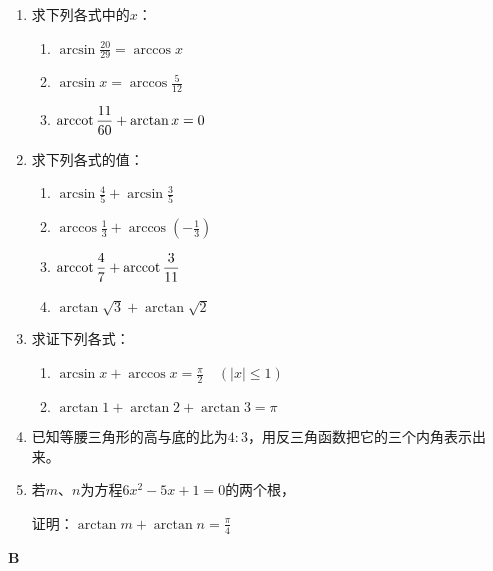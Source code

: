 \begin{enumerate}
\item 求下列各式中的$x$：
\begin{multicols}{2}
\begin{enumerate}[(1)]
    \item $\arcsin\frac{20}{29}=\arccos x$
    \item $\arcsin x=\arccos\frac{5}{12}$
    \item ${\rm arccot\,}\dfrac{11}{60}+\arctan x=0$
\end{enumerate}
\end{multicols}

\item 求下列各式的值：
\begin{multicols}{2}
\begin{enumerate}[(1)]
\item $\arcsin\frac{4}{5}+\arcsin\frac{3}{5}$
\item $\arccos\frac{1}{3}+\arccos\left(-\frac{1}{3}\right)$
\item ${\rm arccot\,}\dfrac{4}{7}+{\rm arccot\,} \dfrac{3}{11}$
\item $\arctan\sqrt{3}+\arctan\sqrt{2}$
\end{enumerate}
\end{multicols}

\item 求证下列各式：
\begin{enumerate}[(1)]
    \item $\arcsin x+\arccos x=\frac{\pi}{2}\quad (|x|\le 1)$
    \item $\arctan 1+\arctan 2+\arctan 3=\pi$
\end{enumerate}

\item 已知等腰三角形的高与底的比为$4:3$，用反三角函数把它的三个内角表示出来。
\item 若$m$、$n$为方程$6x^2-5x+1=0$的两个根，

证明：$\arctan m+\arctan n=\frac{\pi}{4}$
\end{enumerate}


\begin{center}
    \bfseries B
\end{center}

